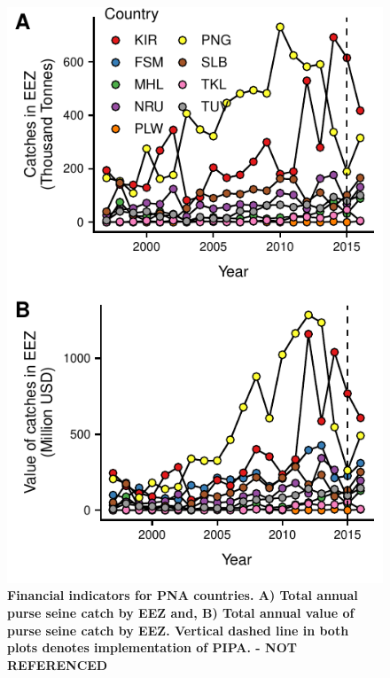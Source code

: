 \documentclass[12pt]{article}
\begin{document}
\begin{figure}
\centering
	\includegraphics{img/catches.pdf}
	\caption{\label{fig:catches}\textbf{Financial indicators for PNA countries. A) Total annual purse seine catch by EEZ and, B) Total annual value of purse seine catch by EEZ. Vertical dashed line in both plots denotes implementation of PIPA. - NOT REFERENCED}}
\end{figure}
\end{document}
